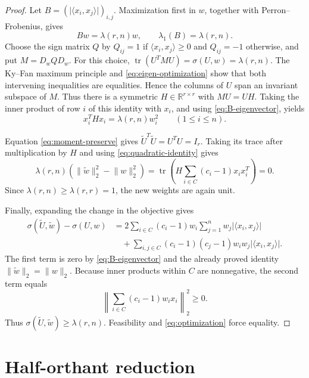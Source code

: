 \documentclass[11pt]{article}
\newcommand{\R}{\mathbb{R}}
\newcommand{\ip}[2]{\langle #1,#2\rangle}
\begin{document}
\begin{proof}
Let $B=(\lvert\ip{x_i}{x_j}\rvert)_{i,j}$.  Maximization first in $w$,
together with Perron--Frobenius, gives
\begin{equation}\label{eq:B-eigenvector}
 Bw=\lambda(r,n)w,
 \qquad \lambda_1(B)=\lambda(r,n).
\end{equation}
Choose the sign matrix $Q$ by $Q_{ij}=1$ if
$\ip{x_i}{x_j}\ge0$ and $Q_{ij}=-1$ otherwise, and put
$M=D_wQD_w$.  For this choice,
$\operatorname{tr}(U^TMU)=\sigma(U,w)=\lambda(r,n)$.  The Ky--Fan maximum
principle and \eqref{eq:eigen-optimization} show that both intervening
inequalities are equalities.  Hence the columns of $U$ span an invariant
subspace of $M$.  Thus there is a symmetric $H\in\R^{r\times r}$ with
$MU=UH$.  Taking the inner product of row $i$ of this identity with $x_i$,
and using \eqref{eq:B-eigenvector}, yields
\begin{equation}\label{eq:quadratic-identity}
 x_i^THx_i=\lambda(r,n)w_i^2\qquad(1\le i\le n).
\end{equation}

Equation \eqref{eq:moment-preserve} gives
$\widetilde U^T\widetilde U=U^TU=I_r$.  Taking its trace after
multiplication by $H$ and using \eqref{eq:quadratic-identity} gives
\[
 \lambda(r,n)(\lVert\widetilde w\rVert_2^2-\lVert w\rVert_2^2)
 =\operatorname{tr}\!\left(
 H\sum_{i\in C}(c_i-1)x_ix_i^T\right)=0.
\]
Since $\lambda(r,n)\ge\lambda(r,r)=1$, the new weights are again unit.

Finally, expanding the change in the objective gives
\begin{align*}
 \sigma(\widetilde U,\widetilde w)-\sigma(U,w)
 &=2\sum_{i\in C}(c_i-1)w_i
       \sum_{j=1}^n w_j\lvert\ip{x_i}{x_j}\rvert\\
 &\quad+\sum_{i,j\in C}(c_i-1)(c_j-1)w_iw_j
       \lvert\ip{x_i}{x_j}\rvert.
\end{align*}
The first term is zero by \eqref{eq:B-eigenvector} and the already proved
identity $\lVert\widetilde w\rVert_2=\lVert w\rVert_2$.  Because inner
products within $C$ are nonnegative, the second term equals
\[
 \left\lVert\sum_{i\in C}(c_i-1)w_ix_i\right\rVert_2^2\ge0.
\]
Thus $\sigma(\widetilde U,\widetilde w)\ge\lambda(r,n)$.  Feasibility and
\eqref{eq:optimization} force equality.
\end{proof}

\section{Half-orthant reduction}
\end{document}
